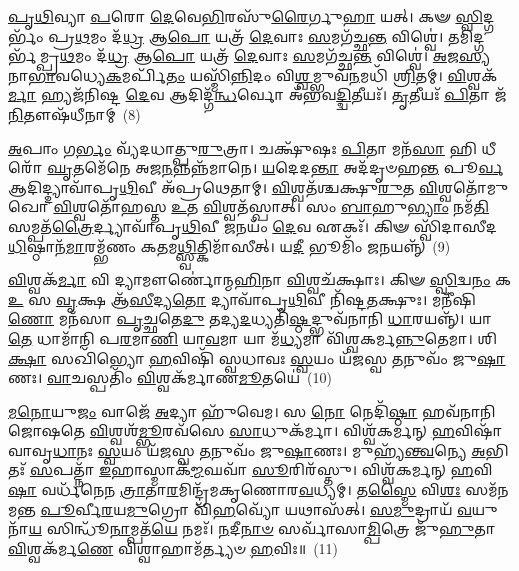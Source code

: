 \-\ul{𑌪𑍃}\-\-\ul{𑌥𑌿}\-𑌵𑍍𑌯𑌾 \ul{𑌪}\-𑌰𑍋 \ul{𑌦𑍇}\-𑌵𑍇\-\ul{𑌭𑌿}\-𑌰𑌸𑍁᳴\-\ul{𑌰𑍈}\-𑌰𑍍𑌗𑍁\-\ul{𑌹𑌾} 𑌯𑌤𑍍। 𑌕𑍟 \ul{𑌸𑍍𑌵𑌿}\-𑌦𑍍𑌗𑌰𑍍𑌭𑌂᳴ 𑌪𑍍𑌰\-\ul{𑌥}\-𑌮𑌂 𑌦᳴\-\ul{𑌧𑍍𑌰} 𑌆\-\ul{𑌪𑍋} 𑌯𑌤𑍍𑌰᳴ \ul{𑌦𑍇}\-𑌵𑌾𑌃 \ul{𑌸}\-𑌮𑌗᳴𑌚𑍍𑌛\-\ul{𑌨𑍍𑌤} 𑌵𑌿𑌶𑍍𑌵𑍇॑। 𑌤𑌮𑌿𑌦𑍍𑌗𑌰𑍍𑌭᳴𑌮𑍍𑌪𑍍𑌰\-\ul{𑌥}\-𑌮𑌂 𑌦᳴\-\ul{𑌧𑍍𑌰} 𑌆\-\ul{𑌪𑍋} 𑌯𑌤𑍍𑌰᳴ \ul{𑌦𑍇}\-𑌵𑌾𑌃 \ul{𑌸}\-𑌮𑌗᳴𑌚𑍍𑌛\-\ul{𑌨𑍍𑌤} 𑌵𑌿𑌶𑍍𑌵𑍇॑। \ul{𑌅}\-𑌜\-\ul{𑌸𑍍𑌯} 𑌨𑌾\-\ul{𑌭𑌾}\-𑌵𑌧𑍍𑌯𑍇\-\ul{𑌕}\-𑌮𑌰𑍍𑌪𑌿᳴\-\ul{𑌤𑌂} 𑌯𑌸𑍍𑌮𑌿᳴\-\ul{𑌨𑍍𑌨𑌿}\-𑌦𑌂 𑌵𑌿\-\ul{𑌶𑍍𑌵}\-𑌮𑍍𑌭𑍁𑌵᳴\-\ul{𑌨}\-\-𑌮𑌧𑌿᳴ \ul{𑌶𑍍𑌰𑌿}\-𑌤𑌮𑍍। \ul{𑌵𑌿}\-𑌶𑍍𑌵𑌕᳴\-\ul{𑌰𑍍𑌮𑌾} 𑌹𑍍𑌯𑌜᳴𑌨𑌿𑌷𑍍𑌟 \ul{𑌦𑍇}\-𑌵 𑌆𑌦𑌿𑌦𑍍𑌗᳴\-\ul{𑌨𑍍𑌧}\-𑌰𑍍𑌵𑍋 𑌅᳴𑌭𑌵\-\ul{𑌦𑍍𑌦𑍍𑌵𑌿}\-𑌤𑍀𑌯𑌃᳴। \ul{𑌤𑍃}\-𑌤𑍀𑌯𑌃᳴ \ul{𑌪𑌿}\-𑌤𑌾 𑌜᳴\-\ul{𑌨𑌿}\-𑌤𑍗𑌷᳴𑌧𑍀𑌨𑌾𑌮𑍍~(8)

\-\ul{𑌅}\-𑌪𑌾𑌂 𑌗\-\ul{𑌰𑍍𑌭𑌂} 𑌵𑍍𑌯᳴𑌦𑌧𑌾𑌤𑍍𑌪𑍁\-\ul{𑌰𑍁}\-𑌤𑍍𑌰𑌾। 𑌚𑌕𑍍𑌷𑍁᳴𑌷𑌃 \ul{𑌪𑌿}\-𑌤𑌾 𑌮𑌨᳴\-\ul{𑌸𑌾} 𑌹𑌿 𑌧𑍀𑌰𑍋᳴ \ul{𑌘𑍃}\-𑌤𑌮𑍇᳴𑌨𑍇 𑌅𑌜\-\ul{𑌨}\-𑌨𑍍𑌨𑌨𑍍𑌨᳴𑌮𑌾𑌨𑍇। \ul{𑌯}\-𑌦𑍇𑌦\-\ul{𑌨𑍍𑌤𑌾} 𑌅𑌦᳴𑌦𑍃𑍞𑌹\-\ul{𑌨𑍍𑌤} 𑌪𑍂\-\ul{𑌰𑍍𑌵} 𑌆𑌦𑌿𑌦𑍍𑌦𑍍𑌯𑌾𑌵𑌾᳴𑌪𑍃\-\ul{𑌥𑌿}\-𑌵𑍀 𑌅᳴𑌪𑍍𑌰𑌥𑍇𑌤𑌾𑌮𑍍। \ul{𑌵𑌿}\-𑌶𑍍𑌵𑌤᳴𑌶𑍍𑌚𑌕𑍍𑌷𑍁\-\ul{𑌰𑍁}\-𑌤 \ul{𑌵𑌿}\-𑌶𑍍𑌵𑌤𑍋᳴𑌮𑍁𑌖𑍋 \ul{𑌵𑌿}\-𑌶𑍍𑌵𑌤𑍋᳴𑌹𑌸𑍍𑌤 \ul{𑌉}\-𑌤 \ul{𑌵𑌿}\-𑌶𑍍𑌵𑌤᳴𑌸𑍍𑌪𑌾𑌤𑍍। 𑌸𑌂 \ul{𑌬𑌾}\-𑌹𑍁\-\ul{𑌭𑍍𑌯𑌾𑌂} 𑌨𑌮᳴\-\ul{𑌤𑌿} 𑌸𑌮𑍍𑌪𑌤᳴\-\ul{𑌤𑍍𑌰𑍈}\-𑌰𑍍𑌦𑍍𑌯𑌾𑌵𑌾᳴𑌪𑍃\-\ul{𑌥𑌿}\-𑌵𑍀 \ul{𑌜}\-𑌨𑌯𑌂᳴ \ul{𑌦𑍇}\-𑌵 𑌏𑌕𑌃᳴। 𑌕𑌿𑍟 𑌸𑍍𑌵𑌿᳴𑌦𑌾𑌸𑍀𑌦\-\ul{𑌧𑌿}\-𑌷𑍍𑌠𑌾𑌨᳴\-\ul{𑌮𑌾}\-𑌰𑌮𑍍𑌭᳴𑌣𑌂 𑌕\-\ul{𑌤}\-𑌮\-\ul{𑌥𑍍𑌸𑍍𑌵𑌿}\-𑌤𑍍𑌕𑌿𑌮𑌾᳴𑌸𑍀𑌤𑍍। 𑌯\-\ul{𑌦𑍀} 𑌭𑍂𑌮𑌿𑌂᳴ \ul{𑌜}\-𑌨𑌯𑌨𑍍𑌨𑍍᳴~(9)

\-\ul{𑌵𑌿}\-𑌶𑍍𑌵𑌕᳴\-\ul{𑌰𑍍𑌮𑌾} 𑌵𑌿 𑌦𑍍𑌯𑌾𑌮𑍗𑌰𑍍𑌣𑍋॑𑌨𑍍𑌮\-\ul{𑌹𑌿}\-𑌨𑌾 \ul{𑌵𑌿}\-𑌶𑍍𑌵𑌚᳴𑌕𑍍𑌷𑌾𑌃। 𑌕𑌿𑍟 \ul{𑌸𑍍𑌵𑌿}\-𑌦𑍍𑌵\-\ul{𑌨𑌂} 𑌕 \ul{𑌉} 𑌸 \ul{𑌵𑍃}\-𑌕𑍍𑌷 𑌆᳴\-\ul{𑌸𑍀}\-𑌦𑍍𑌯\-\ul{𑌤𑍋} 𑌦𑍍𑌯𑌾𑌵𑌾᳴𑌪𑍃\-\ul{𑌥𑌿}\-𑌵𑍀 𑌨𑌿᳴𑌷𑍍𑌟\-\ul{𑌤}\-𑌕𑍍𑌷𑍁𑌃। 𑌮𑌨𑍀᳴𑌷𑌿\-\ul{𑌣𑍋} 𑌮𑌨᳴𑌸𑌾 \ul{𑌪𑍃}\-𑌚𑍍𑌛𑌤𑍇\-\ul{𑌦𑍁} 𑌤𑌦𑍍𑌯\-\ul{𑌦}\-𑌧𑍍𑌯𑌤𑌿᳴\-\ul{𑌷𑍍𑌠}\-𑌦𑍍𑌭𑍁𑌵᳴𑌨𑌾𑌨𑌿 \ul{𑌧𑌾}\-𑌰𑌯𑌨𑍍𑌨𑍍᳴। 𑌯𑌾 \ul{𑌤𑍇} 𑌧𑌾𑌮𑌾᳴𑌨𑌿 𑌪\-\ul{𑌰}\-𑌮𑌾\-\ul{𑌣𑌿} 𑌯𑌾\-\ul{𑌵}\-𑌮𑌾 𑌯𑌾 𑌮᳴\-\ul{𑌧𑍍𑌯}\-𑌮𑌾 𑌵𑌿᳴𑌶𑍍𑌵𑌕𑌰𑍍𑌮\-\ul{𑌨𑍍𑌨𑍁}\-𑌤𑍇𑌮𑌾। 𑌶𑌿\-\ul{𑌕𑍍𑌷𑌾} 𑌸𑌖𑌿᳴𑌭𑍍𑌯𑍋 \ul{𑌹}\-𑌵𑌿𑌷𑌿᳴ 𑌸𑍍𑌵𑌧𑌾𑌵𑌃 \ul{𑌸𑍍𑌵}\-𑌯𑌂 𑌯᳴𑌜𑌸𑍍𑌵 \ul{𑌤}\-𑌨𑍁𑌵𑌂᳴ 𑌜𑍁\-\ul{𑌷𑌾}\-𑌣𑌃। \ul{𑌵𑌾}\-𑌚𑌸𑍍𑌪𑌤𑌿𑌂᳴ \ul{𑌵𑌿}\-𑌶𑍍𑌵𑌕᳴𑌰𑍍𑌮𑌾𑌣\-\ul{𑌮𑍂}\-𑌤𑌯𑍇॑~(10)

\-\ul{𑌮}\-\-\ul{𑌨𑍋}\-𑌯𑍁\-\ul{𑌜𑌂} 𑌵𑌾𑌜𑍇᳴ \ul{𑌅}\-𑌦𑍍𑌯𑌾 𑌹𑍁᳴𑌵𑍇𑌮। 𑌸 \ul{𑌨𑍋} 𑌨𑍇𑌦𑌿᳴\-\ul{𑌷𑍍𑌠𑌾} 𑌹𑌵᳴𑌨𑌾𑌨𑌿 𑌜𑍋𑌷𑌤𑍇 \ul{𑌵𑌿}\-𑌶𑍍𑌵𑌶᳴\-\ul{𑌮𑍍𑌭𑍂}\-𑌰𑌵᳴𑌸𑍇 \ul{𑌸𑌾}\-𑌧𑍁𑌕᳴𑌰𑍍𑌮𑌾। 𑌵𑌿𑌶𑍍𑌵᳴𑌕𑌰𑍍𑌮𑌨𑍍 \ul{𑌹}\-𑌵𑌿𑌷𑌾᳴ 𑌵𑌾𑌵𑍃\-\ul{𑌧𑌾}\-𑌨𑌃 \ul{𑌸𑍍𑌵}\-𑌯𑌂 𑌯᳴𑌜𑌸𑍍𑌵 \ul{𑌤}\-𑌨𑍁𑌵𑌂᳴ 𑌜𑍁\-\ul{𑌷𑌾}\-𑌣𑌃। 𑌮𑍁𑌹𑍍𑌯᳴\-\ul{𑌨𑍍𑌤𑍍𑌵}\-𑌨𑍍𑌯𑍇 \ul{𑌅}\-𑌭𑌿𑌤𑌃᳴ \ul{𑌸}\-𑌪𑌤𑍍𑌨𑌾᳴ \ul{𑌇}\-𑌹𑌾𑌸𑍍𑌮𑌾𑌕᳴\-\ul{𑌮𑍍𑌮}\-𑌘𑌵𑌾᳴ \ul{𑌸𑍂}\-𑌰𑌿𑌰᳴𑌸𑍍𑌤𑍁। 𑌵𑌿𑌶𑍍𑌵᳴𑌕𑌰𑍍𑌮𑌨𑍍 \ul{𑌹}\-𑌵𑌿\-\ul{𑌷𑌾} 𑌵𑌰𑍍𑌧᳴𑌨𑍇𑌨 \ul{𑌤𑍍𑌰𑌾}\-𑌤𑌾\-\ul{𑌰}\-𑌮𑌿𑌨𑍍𑌦𑍍𑌰᳴𑌮𑌕𑍃𑌣𑍋𑌰\-\ul{𑌵}\-𑌧𑍍𑌯𑌮𑍍। 𑌤\-\ul{𑌸𑍍𑌮𑍈} 𑌵𑌿\-\ul{𑌶𑌃} 𑌸𑌮᳴𑌨𑌮𑌨𑍍𑌤 \ul{𑌪𑍂}\-𑌰𑍍𑌵𑍀\-\ul{𑌰}\-𑌯\-\ul{𑌮𑍁}\-𑌗𑍍𑌰𑍋 𑌵𑌿᳴\-\ul{𑌹}\-𑌵𑍍𑌯𑍋᳴ 𑌯𑌥𑌾𑌸᳴𑌤𑍍। \ul{𑌸}\-\-\ul{𑌮𑍁}\-𑌦𑍍𑌰𑌾𑌯᳴ \ul{𑌵}\-𑌯𑍁𑌨𑌾᳴\-\ul{𑌯} 𑌸𑌿𑌨𑍍𑌧𑍂᳴\-\ul{𑌨𑌾}\-𑌮𑍍𑌪𑌤᳴\-\ul{𑌯𑍇} 𑌨𑌮𑌃᳴। \ul{𑌨}\-𑌦𑍀\-\ul{𑌨𑌾}\-\-\ul{𑍞} 𑌸𑌰𑍍𑌵𑌾᳴𑌸𑌾\-\ul{𑌮𑍍𑌪𑌿}\-𑌤𑍍𑌰𑍇 𑌜𑍁᳴\-\ul{𑌹𑍁}\-𑌤𑌾 \ul{𑌵𑌿}\-𑌶𑍍𑌵𑌕᳴𑌰𑍍𑌮\-\ul{𑌣𑍇} 𑌵𑌿𑌶𑍍𑌵𑌾𑌹𑌾𑌮᳴𑌰𑍍𑌤𑍍𑌯𑍞 \ul{𑌹}\-𑌵𑌿𑌃॥~(11)

